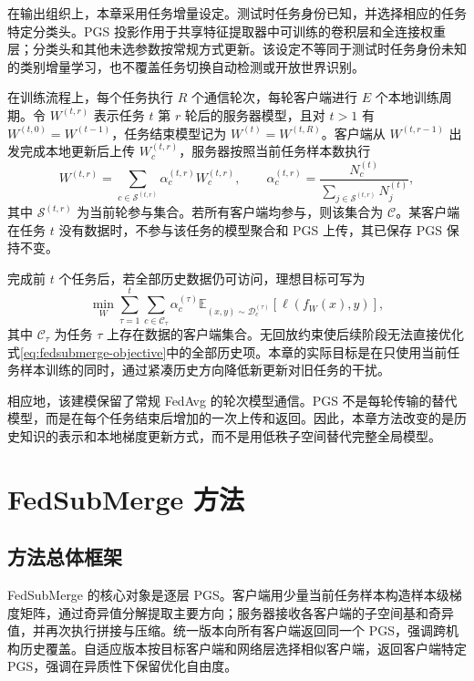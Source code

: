 在输出组织上，本章采用任务增量设定。测试时任务身份已知，并选择相应的任务特定分类头。PGS 投影作用于共享特征提取器中可训练的卷积层和全连接权重层；分类头和其他未选参数按常规方式更新。该设定不等同于测试时任务身份未知的类别增量学习，也不覆盖任务切换自动检测或开放世界识别。

在训练流程上，每个任务执行 $R$ 个通信轮次，每轮客户端进行 $E$ 个本地训练周期。令 $W^{(t,r)}$ 表示任务 $t$ 第 $r$ 轮后的服务器模型，且对 $t>1$ 有 $W^{(t,0)}=W^{(t-1)}$，任务结束模型记为 $W^{(t)}=W^{(t,R)}$。客户端从 $W^{(t,r-1)}$ 出发完成本地更新后上传 $W_c^{(t,r)}$，服务器按照当前任务样本数执行
\begin{equation}
W^{(t,r)}
=
\sum_{c\in\mathcal{S}^{(t,r)}}
\alpha_c^{(t,r)}W_c^{(t,r)},
\qquad
\alpha_c^{(t,r)}
=
\frac{N_c^{(t)}}{\sum_{j\in\mathcal{S}^{(t,r)}}N_j^{(t)}},
\label{eq:fedsubmerge-fedavg}
\end{equation}
其中 $\mathcal{S}^{(t,r)}$ 为当前轮参与集合。若所有客户端均参与，则该集合为 $\mathcal{C}$。某客户端在任务 $t$ 没有数据时，不参与该任务的模型聚合和 PGS 上传，其已保存 PGS 保持不变。

完成前 $t$ 个任务后，若全部历史数据仍可访问，理想目标可写为
\begin{equation}
\min_W
\sum_{\tau=1}^{t}
\sum_{c\in\mathcal{C}_{\tau}}
\alpha_c^{(\tau)}
\mathbb{E}_{(x,y)\sim\mathcal{D}^{(\tau)}_c}
\left[\ell\!\left(f_W(x),y\right)\right],
\label{eq:fedsubmerge-objective}
\end{equation}
其中 $\mathcal{C}_{\tau}$ 为任务 $\tau$ 上存在数据的客户端集合。无回放约束使后续阶段无法直接优化式\eqref{eq:fedsubmerge-objective}中的全部历史项。本章的实际目标是在只使用当前任务样本训练的同时，通过紧凑历史方向降低新更新对旧任务的干扰。

相应地，该建模保留了常规 FedAvg 的轮次模型通信。PGS 不是每轮传输的替代模型，而是在每个任务结束后增加的一次上传和返回。因此，本章方法改变的是历史知识的表示和本地梯度更新方式，而不是用低秩子空间替代完整全局模型。

\section{FedSubMerge 方法}
\label{sec:fedsubmerge-method}

\subsection{方法总体框架}
\label{subsec:fedsubmerge-overview}

FedSubMerge 的核心对象是逐层 PGS。客户端用少量当前任务样本构造样本级梯度矩阵，通过奇异值分解提取主要方向；服务器接收各客户端的子空间基和奇异值，并再次执行拼接与压缩。统一版本向所有客户端返回同一个 PGS，强调跨机构历史覆盖。自适应版本按目标客户端和网络层选择相似客户端，返回客户端特定 PGS，强调在异质性下保留优化自由度。


